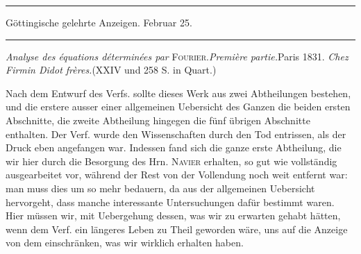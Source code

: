 \clearpage
{}
\begin{center}
\rule{0.55\linewidth}{0.4pt}\par Göttingische gelehrte Anzeigen. Februar 25.\par \rule{0.55\linewidth}{0.4pt}
\end{center}
\textit{Analyse des équations déterminées par} \textsc{Fourier}.\quad\textit{Première partie.}\quad Paris 1831. \textit{Chez Firmin Didot frères.}\quad (XXIV und 258 S. in Quart.)


Nach dem Entwurf des Verfs. sollte dieses Werk aus zwei Abtheilungen bestehen, und die erstere ausser einer allgemeinen Uebersicht des Ganzen die beiden ersten Abschnitte, die zweite Abtheilung hingegen die fünf übrigen Abschnitte enthalten. Der Verf. wurde den Wissenschaften durch den Tod entrissen, als der Druck eben angefangen war. Indessen fand sich die ganze erste Abtheilung, die wir hier durch die Besorgung des Hrn. \textsc{Navier} erhalten, so gut wie vollständig ausgearbeitet vor, während der Rest von der Vollendung noch weit entfernt war: man muss dies um so mehr bedauern, da aus der allgemeinen Uebersicht hervorgeht, dass manche interessante Untersuchungen dafür bestimmt waren. Hier müssen wir, mit Uebergehung dessen, was wir zu erwarten gehabt hätten, wenn dem Verf. ein längeres Leben zu Theil geworden wäre, uns auf die Anzeige von dem einschränken, was wir wirklich erhalten haben.

